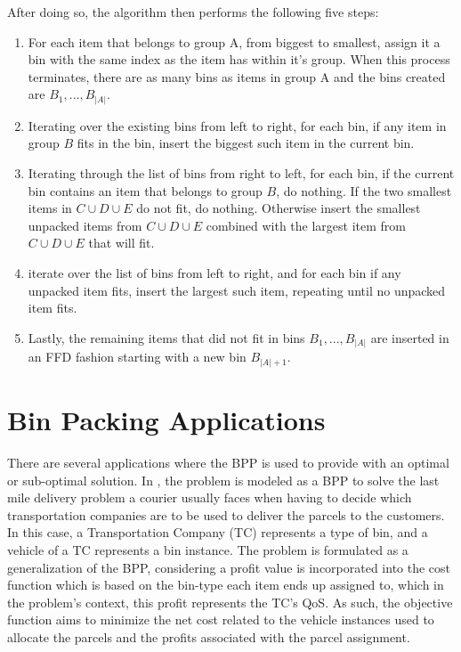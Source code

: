 After doing so, the algorithm then performs the following five steps: 
\begin{enumerate}
    \item For each item that belongs to group A, from biggest to smallest,
        assign it a bin with the same index as the item has within it's group.
        When this process terminates, there are as many bins as items in group A
        and the bins created are $B_1, ..., B_{|A|}$.
    \item Iterating over the existing bins from left to right, for each bin, if
        any item in group $B$ fits in the bin, insert the biggest such item in
        the current bin.
    \item Iterating through the list of bins from right to left, for each bin,
        if the current bin contains an item that belongs to group $B$, do
        nothing. If the two smallest items in $C \cup D \cup E$ do not fit, do
        nothing. Otherwise insert the smallest unpacked items from $C \cup D
        \cup E$ combined with the largest item from $C \cup D \cup E$ that will
        fit.
    \item iterate over the list of bins from left to right, and for each bin if
        any unpacked item fits, insert the largest such item, repeating until no
        unpacked item fits.
    \item Lastly, the remaining items that did not fit in bins $B_1, ...,
        B_{|A|}$ are inserted in an FFD fashion starting with a new bin
        $B_{|A|+1}$. 
\end{enumerate}

\section{Bin Packing Applications}

There are several applications where the BPP is used to provide with an optimal or
sub-optimal solution. In \cite{baldi2019generalized}, the problem is modeled as
a BPP to solve the last mile delivery problem a courier usually faces when
having to decide which transportation companies are to be used to deliver the
parcels to the customers. In this case, a Transportation Company (TC) represents
a type of bin, and a vehicle of a TC represents a bin instance. The problem is
formulated as a generalization of the BPP, considering a profit value is
incorporated into the cost function which is based on the bin-type each item
ends up assigned to, which in the problem's context, this profit represents the TC's
QoS. As such, the objective function aims to minimize the net cost related to
the vehicle instances used to allocate the parcels and the profits associated
with the parcel assignment.

